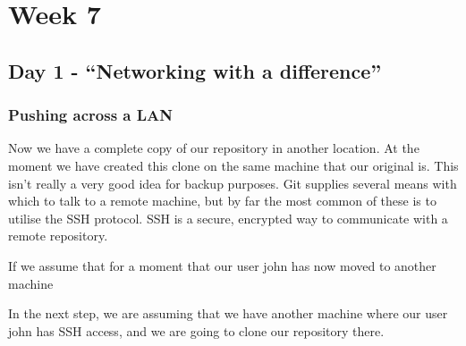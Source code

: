 \cleardoublepage
\chapter{Week 7}

\section{Day 1 - ``Networking with a difference''}
\subsection{Pushing across a LAN}

Now we have a complete copy of our repository in another location.  At the moment we have created this clone on the same machine that our original is.  This isn't really a very good idea for backup purposes.  Git supplies several means with which to talk to a remote machine, but by far the most common of these is to utilise the SSH protocol.  SSH is a secure, encrypted way to communicate with a remote repository.  

If we assume that for a moment that our user john has now moved to another machine

In the next step, we are assuming that we have another machine where our user john has SSH access, and we are going to clone our repository there.
